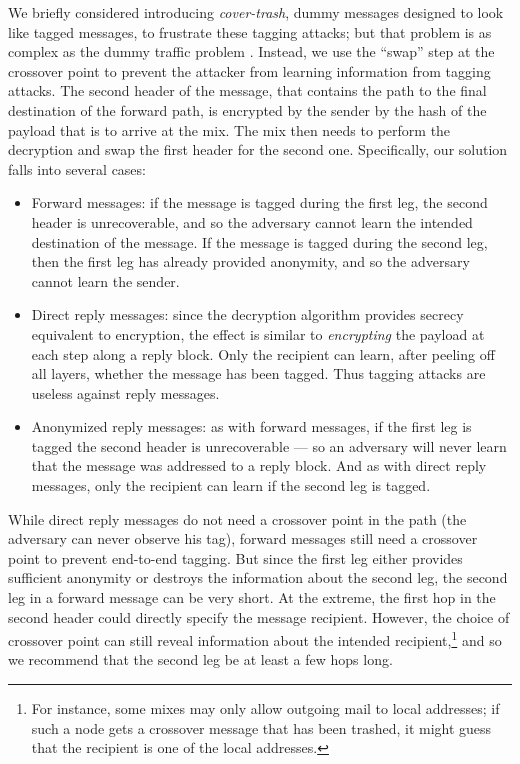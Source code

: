 \documentclass[11pt]{IEEEtran}
\begin{document}
We briefly considered introducing \emph{cover-trash}, dummy messages
designed to look like tagged messages, to frustrate
these tagging attacks; but that problem is as complex as the dummy
traffic problem \cite{langos02}. Instead, we use the
``swap'' step at the
crossover point to prevent the attacker from learning information from
tagging attacks. The second header of the message, that contains the
path to the final destination of the forward path,  is encrypted by the
sender by the hash of the payload that is to arrive at the mix. The
mix then needs to perform the decryption and swap the first header for
the second one.
Specifically, our solution falls into several cases:

\begin{itemize}
\item Forward messages: if the message is tagged during the first leg,
the second header is unrecoverable, and so the adversary cannot
learn the intended destination of the message. If the message is tagged
during the second leg, then the first leg has already provided anonymity,
and so the adversary cannot learn the sender.
\item Direct reply messages: since the decryption algorithm provides
secrecy equivalent to encryption, the effect is similar to {\em encrypting}
the payload at each step along a reply block. Only the recipient can learn,
after peeling off all layers, whether the message has been tagged. Thus
tagging attacks are useless against reply messages.
\item Anonymized reply messages: as with forward messages, if the first leg
is tagged the second header is unrecoverable --- so an adversary will
never learn that the message was addressed to a reply block. And as with
direct reply messages, only the recipient can learn if the second leg is
tagged.
\end{itemize}

While direct reply messages do not need a crossover point in the path
(the adversary can never observe his tag), forward messages still need a
crossover point to prevent end-to-end tagging. But since the first leg
either provides sufficient anonymity or destroys the information about
the second leg, the second leg in a forward message can be very short.
At the extreme, the first hop in the second header could directly
specify the message recipient. However, the choice of crossover point
can still reveal information about the intended recipient,\footnote{For instance,
some mixes may only allow outgoing mail to local addresses; if such a
node gets a crossover message that has been trashed, it might guess
that the recipient is one of the local addresses.} and so we recommend
that the second leg be at least a few hops long.
\end{document}
